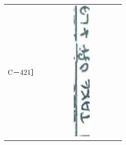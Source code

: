 \documentclass[10pt]{article}
\begin{document}
\begin{center}
\begin{tabular}{|c|c|c|c|c|c|c|c|c|c|}
{} &  &  &  \\
\hline
C－421］ &  &  &  &  & \includegraphics[max width=\textwidth]{2025_02_27_dd68c3d38de88f0516d9g-053(2)}

\end{tabular}
\end{center}
\end{document}
